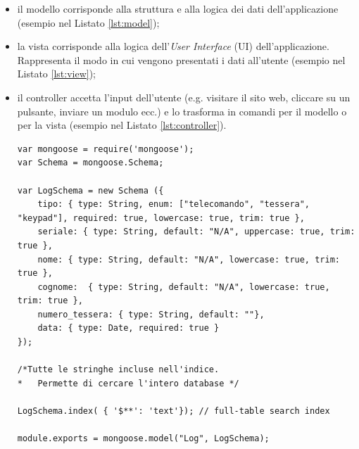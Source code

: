 \documentclass[12pt]{report}
\begin{document}
\begin{itemize}
	\item il modello corrisponde alla struttura e alla logica dei dati dell'applicazione (esempio nel Listato \ref{lst:model});
	\item la vista corrisponde alla logica dell'\emph{User Interface} (UI) dell'applicazione. Rappresenta il modo in cui vengono presentati i dati all'utente (esempio nel Listato \ref{lst:view}); 
	\item il controller accetta l'input dell'utente (e.g. visitare il sito web, cliccare su un pulsante, inviare un modulo ecc.) e lo trasforma in comandi per il modello o per la vista (esempio nel Listato \ref{lst:controller}).
	
\begin{lstlisting}[caption={Creazione del modello dei log con \emph{mongoose}}, label={lst:model}, xleftmargin=\dimexpr-\leftmargini]
var mongoose = require('mongoose');
var Schema = mongoose.Schema;

var LogSchema = new Schema ({
	tipo: { type: String, enum: ["telecomando", "tessera", "keypad"], required: true, lowercase: true, trim: true },
	seriale: { type: String, default: "N/A", uppercase: true, trim: true },
	nome: { type: String, default: "N/A", lowercase: true, trim: true },
	cognome:  { type: String, default: "N/A", lowercase: true, trim: true },
	numero_tessera: { type: String, default: ""},
	data: { type: Date, required: true }
});

/*Tutte le stringhe incluse nell'indice.
*	Permette di cercare l'intero database */

LogSchema.index( { '$**': 'text'}); // full-table search index

module.exports = mongoose.model("Log", LogSchema);
\end{lstlisting}

\pagebreak


\end{itemize}
\end{document}
